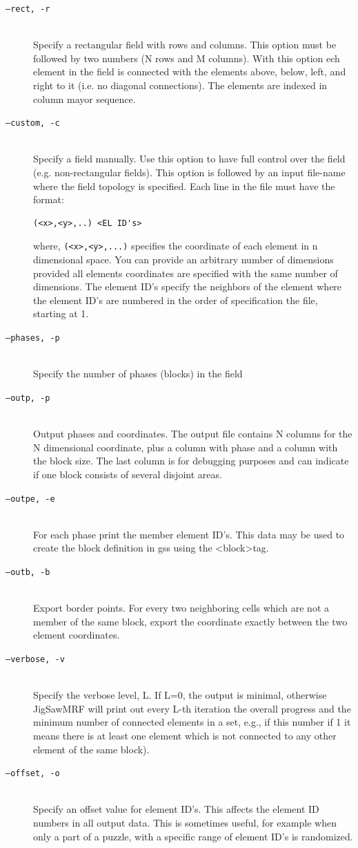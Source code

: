 \documentclass[12pt]{article}
\begin{document}
\begin{description}
\item [\texttt{--rect, -r}] \hfill \\ Specify a rectangular field with rows and columns. This option must be followed by two numbers (N rows and M columns). With this option ech element in the field is connected with the elements above, below, left, and right to it (i.e. no diagonal connections). The elements are indexed in column mayor sequence.  
\item [\texttt{--custom, -c}] \hfill \\ Specify a field manually. Use this option to have full control over the field (e.g. non-rectangular fields). This option is followed by an input file-name where the field topology is specified. Each line in the file must have the format:
\begin{verbatim}
(<x>,<y>,..) <EL ID's>
\end{verbatim}
where, \verb|(<x>,<y>,...)| specifies the coordinate of each element in n dimensional space. You can provide an arbitrary number of dimensions provided all elements coordinates are specified with the same number of dimensions. The element ID's specify the neighbors of the element where the element ID's are numbered in the order of specification the file, starting at 1. 
\item [\texttt{--phases, -p}] \hfill \\ Specify the number of phases (blocks) in the field
\item [\texttt{--outp, -p}] \hfill \\ Output phases and coordinates. The output file contains N columns for the N dimensional coordinate, plus a column with phase and a column with the block size. The last column is for debugging purposes and can indicate if one block consists of several disjoint areas.
\item [\texttt{--outpe, -e}] \hfill \\ For each phase print the member element ID's. This data may be used to create the block definition in gss using the \textless block\textgreater  tag. 
\item [\texttt{--outb, -b}] \hfill \\ Export border points. For every two neighboring cells which are not a member of the same block, export the coordinate exactly between the two element coordinates.  
\item [\texttt{--verbose, -v}] \hfill \\ Specify the verbose level, L. If  L=0, the output is minimal, otherwise  JigSawMRF will print out every L-th iteration the 
overall progress and the minimum number of connected elements in a set, e.g., if this number if 1 it means there is at least one element which is not connected to any other element of the same block).
\item [\texttt{--offset, -o}] \hfill \\ Specify an offset value for element ID's. This affects the element ID numbers in all output data. This is sometimes useful, for example when only a part of a puzzle, with a specific range of element ID's is randomized.
\end{description}
\end{document}
